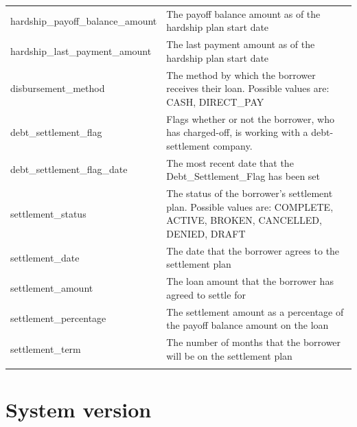 \documentclass[11pt,]{report}
\newenvironment{Shaded}{\begin{snugshade}}{\end{snugshade}}
\newcommand{\NormalTok}[1]{#1}
\begin{document}
\begin{longtable}[t]{>{\raggedright\arraybackslash}p{7cm}>{\raggedright\arraybackslash}p{7cm}}
hardship\_payoff\_balance\_amount & The payoff balance amount as of the hardship plan start date\\
hardship\_last\_payment\_amount & The last payment amount as of the hardship plan start date\\
\addlinespace
disbursement\_method & The method by which the borrower receives their loan. Possible values are: CASH, DIRECT\_PAY\\
debt\_settlement\_flag & Flags whether or not the borrower, who has charged-off, is working with a debt-settlement company.\\
debt\_settlement\_flag\_date & The most recent date that the Debt\_Settlement\_Flag has been set  \\
settlement\_status & The status of the borrower’s settlement plan. Possible values are: COMPLETE, ACTIVE, BROKEN, CANCELLED, DENIED, DRAFT\\
settlement\_date & The date that the borrower agrees to the settlement plan\\
\addlinespace
settlement\_amount & The loan amount that the borrower has agreed to settle for\\
settlement\_percentage & The settlement amount as a percentage of the payoff balance amount on the loan\\
settlement\_term & The number of months that the borrower will be on the settlement plan\\*
\end{longtable}

\normalsize

\hypertarget{system-version}{%
\section{System version}\label{system-version}}

\small

\begin{Shaded}
\end{Shaded}

\normalsize


\end{document}
